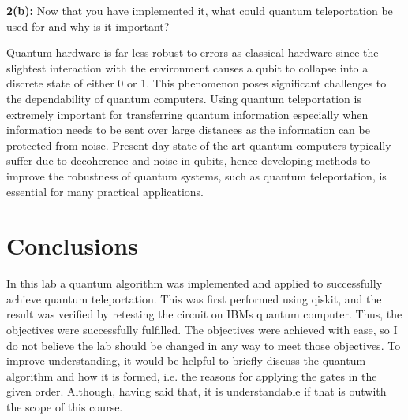 \textbf{2(b):} Now that you have implemented it, what could quantum teleportation be used for and why is it important?

Quantum hardware is far less robust to errors as classical hardware since the slightest interaction with the environment causes a qubit to collapse into a discrete state of either 0 or 1. This phenomenon poses significant challenges to the dependability of quantum computers. Using quantum teleportation is extremely important for transferring quantum information especially when information needs to be sent over large distances as the information can be protected from noise.
Present-day state-of-the-art quantum computers typically suffer due to decoherence and noise in qubits, hence developing methods to improve the robustness of quantum systems, such as quantum teleportation, is essential for many practical applications.

\section{Conclusions}

In this lab a quantum algorithm was implemented and applied to successfully achieve quantum teleportation. This was first performed using qiskit, and the result was verified by retesting the circuit on IBMs quantum computer. Thus, the objectives were successfully fulfilled. The objectives were achieved with ease, so I do not believe the lab should be changed in any way to meet those objectives.
To improve understanding, it would be helpful to briefly discuss the quantum algorithm and how it is formed, i.e. the reasons for applying the gates in the given order. Although, having said that, it is understandable if that is outwith the scope of this course.